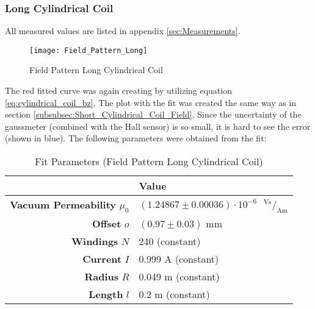 \subsubsection{Long Cylindrical Coil}
\label{subsubsec:Long_Cylindrical_Coil_Field}
All measured values are listed in appendix \ref{sec:Measurements}.
\begin{figure}[H]
	\centering
	\texttt{[image: Field\_Pattern\_Long]}
	\caption{Field Pattern Long Cylindrical Coil}
	\label{fig:Field_Pattern_Long}
\end{figure}
The red fitted curve was again creating by utilizing equation \ref{eq:cylindrical_coil_bz}. The plot with the fit was created the same way as in section \ref{subsubsec:Short_Cylindrical_Coil_Field}. Since the uncertainty of the gaussmeter (combined with the Hall sensor) is so small, it is hard to see the error (shown in blue). The following parameters were obtained from the fit:
\begin{table}[H]
	\centering
	\renewcommand{\arraystretch}{1.3}
	\begin{tabular}{r|l}
		& \textbf{Value} \\
		\hline\hline
		\textbf{Vacuum Permeability} $\mu_0$ & $(1.24867\pm0.00036)\cdot10^{-6}$\ $\,^\text{Vs}\!/_\text{Am}$ \\
		\textbf{Offset} $o$ & $(0.97\pm0.03)$ mm \\
		\textbf{Windings} $N$ & 240 (constant) \\
		\textbf{Current} $I$ & 0.999 A (constant) \\
		\textbf{Radius} $R$ & 0.049 m (constant) \\
		\textbf{Length} $l$ & 0.2 m (constant) \\
	\end{tabular}
	\caption{Fit Parameters (Field Pattern Long Cylindrical Coil)}
	\label{tab:Field_Pattern_Long}
\end{table}
